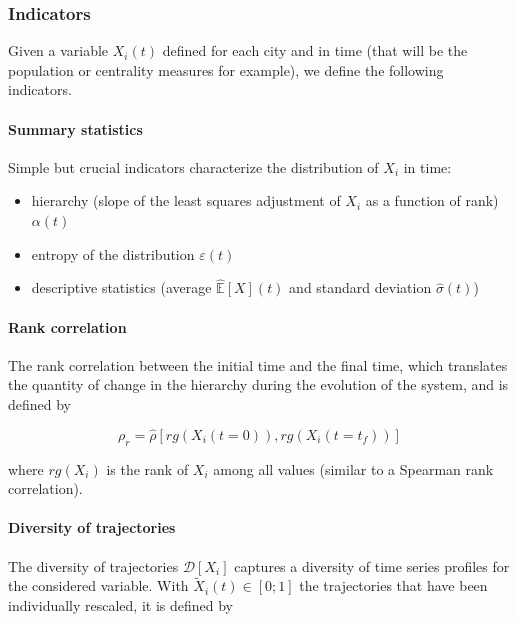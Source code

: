 \documentclass[graybox]{svmult}
\begin{document}
\subsubsection{Indicators}

Given a variable $X_i(t)$ defined for each city and in time (that will be the population or centrality measures for example), we define the following indicators.

\paragraph{Summary statistics}

Simple but crucial indicators characterize the distribution of $X_i$ in time:
\begin{itemize}
	\item hierarchy (slope of the least squares adjustment of $X_i$ as a function of rank) $\alpha (t)$
	\item entropy of the distribution $\varepsilon (t)$
	\item descriptive statistics (average $\hat{\mathbb{E}}\left[X\right] (t)$ and standard deviation $\hat{\sigma} (t)$)
\end{itemize}


\paragraph{Rank correlation}

The rank correlation between the initial time and the final time, which translates the quantity of change in the hierarchy during the evolution of the system, and is defined by

\begin{equation}
\rho_r = \hat{\rho}\left[rg(X_i(t=0)),rg(X_i(t=t_f))\right]
\end{equation}

where $rg(X_i)$ is the rank of $X_i$ among all values (similar to a Spearman rank correlation).


\paragraph{Diversity of trajectories}

The diversity of trajectories $\mathcal{D}\left[X_i\right]$ captures a diversity of time series profiles for the considered variable. With $\tilde{X}_i(t)\in \left[0;1\right]$ the trajectories that have been individually rescaled, it is defined by
\end{document}
